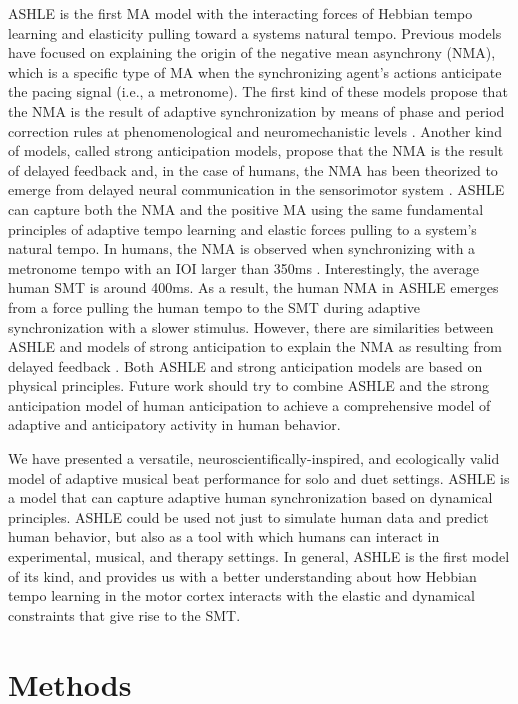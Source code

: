 \documentclass{report}
\begin{document}
ASHLE is the first MA model with the interacting forces of Hebbian tempo learning and elasticity pulling toward a systems natural tempo. Previous models have focused on explaining the origin of the negative mean asynchrony (NMA), which is a specific type of MA when the synchronizing agent's actions anticipate the pacing signal (i.e., a metronome). The first kind of these models propose that the NMA is the result of adaptive synchronization by means of phase and period correction rules at phenomenological \cite{van2013adaptation} and neuromechanistic levels \cite{bose2019neuromechanistic}. Another kind of models, called strong anticipation models, propose that the NMA is the result of delayed feedback \cite{stepp2010strong} and, in the case of humans, the NMA has been theorized to emerge from delayed neural communication in the sensorimotor system \cite{roman2019delayed}. ASHLE can capture both the NMA and the positive MA using the same fundamental principles of adaptive tempo learning and elastic forces pulling to a system's natural tempo. In humans, the NMA is observed when synchronizing with a metronome tempo with an IOI larger than 350ms \cite{mates1994temporal}. Interestingly, the average human SMT is around 400ms. As a result, the human NMA in ASHLE emerges from a force pulling the human tempo to the SMT during adaptive synchronization with a slower stimulus. However, there are similarities between ASHLE and models of strong anticipation to explain the NMA as resulting from delayed feedback \cite{stepp2010strong, roman2019delayed}. Both ASHLE and strong anticipation models are based on physical principles. Future work should try to combine ASHLE and the strong anticipation model of human anticipation to achieve a comprehensive model of adaptive and anticipatory activity in human behavior.

We have presented a versatile, neuroscientifically-inspired, and ecologically valid model of adaptive musical beat performance for solo and duet settings. ASHLE is a model that can capture adaptive human synchronization based on dynamical principles. ASHLE could be used not just to simulate human data and predict human behavior, but also as a tool with which humans can interact in experimental, musical, and therapy settings. In general, ASHLE is the first model of its kind, and provides us with a better understanding about how Hebbian tempo learning in the motor cortex interacts with the elastic and dynamical constraints that give rise to the SMT.

\section{Methods}
\end{document}
